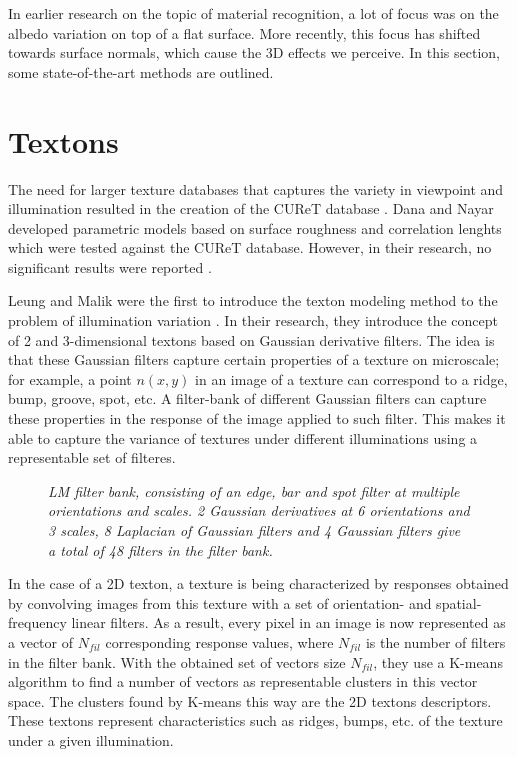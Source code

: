\hypertarget{RelatedWork}{
}
In earlier research on the topic of material recognition, a lot of focus was on the albedo variation on top of a flat surface. More recently, this focus has shifted towards surface normals, which cause the 3D effects we perceive. In this section, some state-of-the-art methods are outlined.

\section{Textons}\label{sec:Textons}

The need for larger texture databases that captures the variety in viewpoint and illumination resulted in the creation of the CUReT database \cite{DanaNayar}. Dana and Nayar developed parametric models based on surface roughness and correlation lenghts which were tested against the CUReT database. However, in their research, no significant results were reported \cite{VarmaZisserman}.

Leung and Malik were the first to introduce the texton modeling method to the problem of illumination variation \cite{LeungMalik}. In their research, they introduce the concept of 2 and 3-dimensional textons based on Gaussian derivative filters. The idea is that these Gaussian filters capture certain properties of a texture on microscale; for example, a point $n(x,y)$ in an image of a texture can correspond to a ridge, bump, groove, spot, etc. A filter-bank of different Gaussian filters can capture these properties in the response of the image applied to such filter. This makes it able to capture the variance of textures under different illuminations using a representable set of filteres.

\begin{figure}[b]
	\begin{center}
	\end{center}
	\caption{\textit{LM filter bank, consisting of an edge, bar and spot filter at multiple orientations and scales. 2 Gaussian derivatives at 6 orientations and 3 scales, 8 Laplacian of Gaussian filters and 4 Gaussian filters give a total of 48 filters in the filter bank.}}
	\label{fig:LM}
\end{figure}


In the case of a 2D texton, a texture is being characterized by responses obtained by convolving images from this texture with a set of orientation- and spatial-frequency linear filters. As a result, every pixel in an image is now represented as a vector of $N_{fil}$ corresponding response values, where $N_{fil}$ is the number of filters in the filter bank. With the obtained set of vectors size $N_{fil}$, they use a K-means algorithm to find a number of vectors as representable clusters in this vector space. The clusters found by K-means this way are the 2D textons descriptors. These textons represent characteristics such as ridges, bumps, etc. of the texture under a given illumination.

